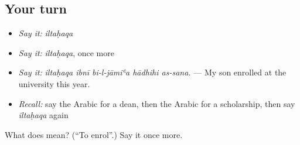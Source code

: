 \subsection*{Your turn}
\begin{itemize}
\raggedright
  \item \emph{Say it:} \emph{iltaḥaqa}
  \item \emph{Say it:} \emph{iltaḥaqa}, once more
  \item \emph{Say it:} \emph{iltaḥaqa ibnī bi-l-jāmiʿa hādhihi as-sana.} — My son enrolled at the university this year.
  \item \emph{Recall:} say the Arabic for a dean, then the Arabic for a scholarship, then say \emph{iltaḥaqa} again
\end{itemize}

\begin{tcolorbox}[breakable,colback=teal!4,colframe=teal!35!black,title={Before you move on}]
What does  mean? (\textquotedblleft{}To enrol\textquotedblright{}.) Say it once more.
\end{tcolorbox}
